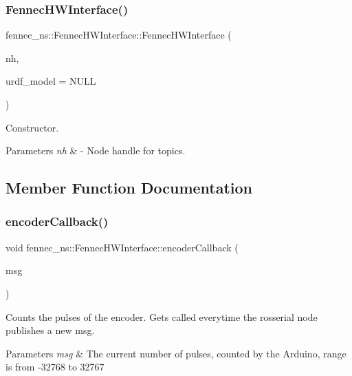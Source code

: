 \subsubsection{\texorpdfstring{Fennec\+H\+W\+Interface()}{FennecHWInterface()}}
{\footnotesize\ttfamily fennec\+\_\+ns\+::\+Fennec\+H\+W\+Interface\+::\+Fennec\+H\+W\+Interface (\begin{DoxyParamCaption}\item[{ros\+::\+Node\+Handle \&}]{nh,  }\item[{urdf\+::\+Model $\ast$}]{urdf\+\_\+model = {\ttfamily NULL} }\end{DoxyParamCaption})}



Constructor. 


\begin{DoxyParams}{Parameters}
{\em nh} & -\/ Node handle for topics. \\
\hline
\end{DoxyParams}


\subsection{Member Function Documentation}
\mbox{\label{classfennec__ns_1_1_fennec_h_w_interface_a918620ccc3c2bc7852b2f9e5fa90c54c}} 
\subsubsection{\texorpdfstring{encoder\+Callback()}{encoderCallback()}}
{\footnotesize\ttfamily void fennec\+\_\+ns\+::\+Fennec\+H\+W\+Interface\+::encoder\+Callback (\begin{DoxyParamCaption}\item[{const std\+\_\+msgs\+::\+Int16\+::\+Const\+Ptr \&}]{msg }\end{DoxyParamCaption})}



Counts the pulses of the encoder. Gets called everytime the rosserial node publishes a new msg. 


\begin{DoxyParams}{Parameters}
{\em msg} & The current number of pulses, counted by the Arduino, range is from -\/32768 to 32767 \\
\hline
\end{DoxyParams}
\mbox{\label{classfennec__ns_1_1_fennec_h_w_interface_a30250e644ed2ef16ee724289c8193066}} 
